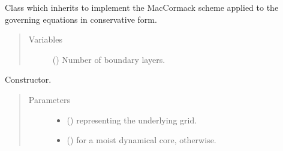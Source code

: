 \documentclass[letterpaper,10pt,english]{sphinxmanual}
\begin{document}
\begin{fulllineitems}
\label{\detokenize{api:dycore.flux_isentropic.FluxIsentropicMacCormack}}
Class which inherits {\hyperref[\detokenize{api:dycore.flux_isentropic.FluxIsentropic}]{}} to implement the MacCormack scheme applied to the
governing equations in conservative form.
\begin{quote}\begin{description}
\item[{Variables}] \leavevmode
{\hyperref[\detokenize{api:dycore.prognostic_isentropic.PrognosticIsentropic.nb}]{}} () \textendash{} Number of boundary layers.

\end{description}\end{quote}

\begin{fulllineitems}
\label{\detokenize{api:dycore.flux_isentropic.FluxIsentropicMacCormack.__init__}}
Constructor.
\begin{quote}\begin{description}
\item[{Parameters}] \leavevmode\begin{itemize}
\item {} 
 () \textendash{} {\hyperref[\detokenize{api:grids.grid_xyz.GridXYZ}]{}} representing the underlying grid.

\item {} 
 () \textendash{}  for a moist dynamical core,  otherwise.

\end{itemize}

\end{description}\end{quote}

\end{fulllineitems}



\end{fulllineitems}
\end{document}
